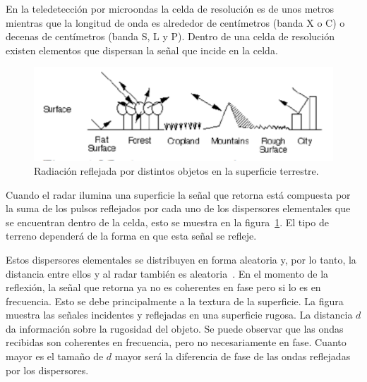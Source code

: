 
En la teledetección por microondas la celda de resolución es de unos metros mientras que la longitud de onda es alrededor de centímetros (banda X o C) o decenas de centímetros (banda S, L y P). Dentro de una celda de resolución existen elementos que dispersan la señal que incide en la celda.

\begin{figure}[hbt]
	\centering    
	\includegraphics[scale=0.7]{../../Figures/Tesis/Capitulo3/Backscatter.pdf}
	\caption{\label{Backscatter}Radiación reflejada por distintos objetos en la superficie terrestre.}
\end{figure} 

Cuando el radar ilumina una superficie la señal que retorna está compuesta por la suma de los pulsos reflejados por cada uno de los dispersores elementales que se encuentran dentro de la celda, esto se muestra en la figura~\ref{Backscatter}. El tipo de terreno dependerá de la forma en que esta señal se refleje.

Estos dispersores elementales se distribuyen en forma aleatoria y, por lo tanto, la distancia entre ellos y al radar también es aleatoria~\cite{Lee2009}. 
En el momento de la reflexión, la señal que retorna ya no es coherentes en fase pero si lo es en frecuencia. Esto se debe principalmente a la textura de la superficie. La figura~\label{CoherenciaFrec} muestra las señales incidentes y reflejadas en una superficie rugosa. La distancia $d$ da información sobre la rugosidad del objeto. Se puede observar que las ondas recibidas son coherentes en frecuencia, pero no necesariamente en fase. Cuanto mayor es el tamaño de $d$ mayor será la diferencia de fase de las ondas reflejadas por los dispersores.

